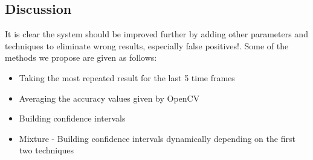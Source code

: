 \subsection{Discussion}
It is clear the system should be improved further by adding other parameters and techniques to eliminate wrong results, especially false positives!. Some of the methods we propose are given as follows:
\begin{itemize}
    \item Taking the most repeated result for the last 5 time frames
    \item Averaging the accuracy values given by OpenCV
    \item Building confidence intervals
    \item Mixture - Building confidence intervals dynamically depending on the first two techniques
\end{itemize}